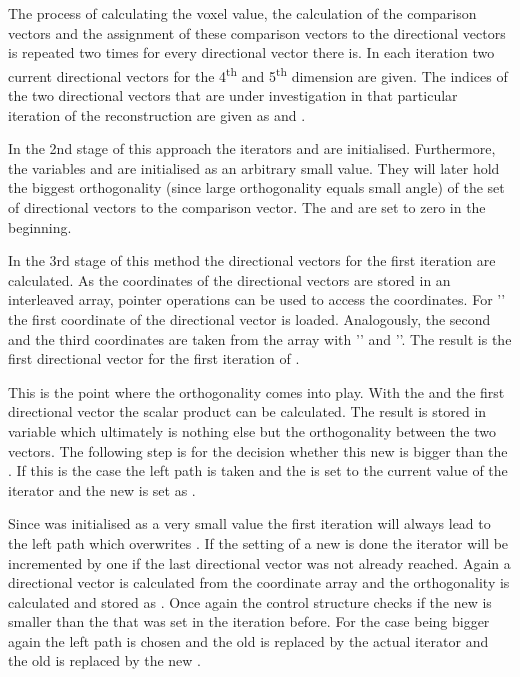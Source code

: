 The process of calculating the voxel value, the calculation of the comparison vectors and the assignment of these comparison vectors to the directional vectors is repeated two times for every directional vector there is. In each iteration two current directional vectors for the 4\textsuperscript{th} and 5\textsuperscript{th} dimension are given. The indices of the two directional vectors that are under investigation in that particular iteration of the reconstruction are given as  and .

In the 2nd stage of this approach the iterators  and  are initialised. Furthermore, the variables  and  are initialised as an arbitrary small value. They will later hold the biggest orthogonality (since large orthogonality equals small angle) of the set of directional vectors to the comparison vector. The  and  are set to zero in the beginning. 

In the 3rd stage of this method the directional vectors for the first iteration  are calculated. As the coordinates of the directional vectors are stored in an interleaved array, pointer operations can be used to access the coordinates. For '' the first coordinate of the directional vector is loaded. Analogously, the second and the third coordinates are taken from the array with '' and ''. The result is the first directional vector  for the first iteration of .

This is the point where the orthogonality comes into play. With the  and the first directional vector  the scalar product can be calculated. The result is stored in variable  which ultimately is nothing else but the orthogonality between the two vectors. The following step is for the decision whether this new  is bigger than the . If this is the case the left path is taken and the  is set to the current value of the iterator  and the new  is set as .

Since  was initialised as a very small value the first iteration will always lead to the left path which overwrites . If the setting of a new  is done the iterator  will be incremented by one if the last directional vector was not already reached.
Again a directional vector  is calculated from the coordinate array and the orthogonality is calculated and stored as . Once again the control structure checks if the new  is smaller than the  that was set in the iteration before. For the case being bigger again the left path is chosen and the old  is replaced by the actual iterator  and the old  is replaced by the new . 


